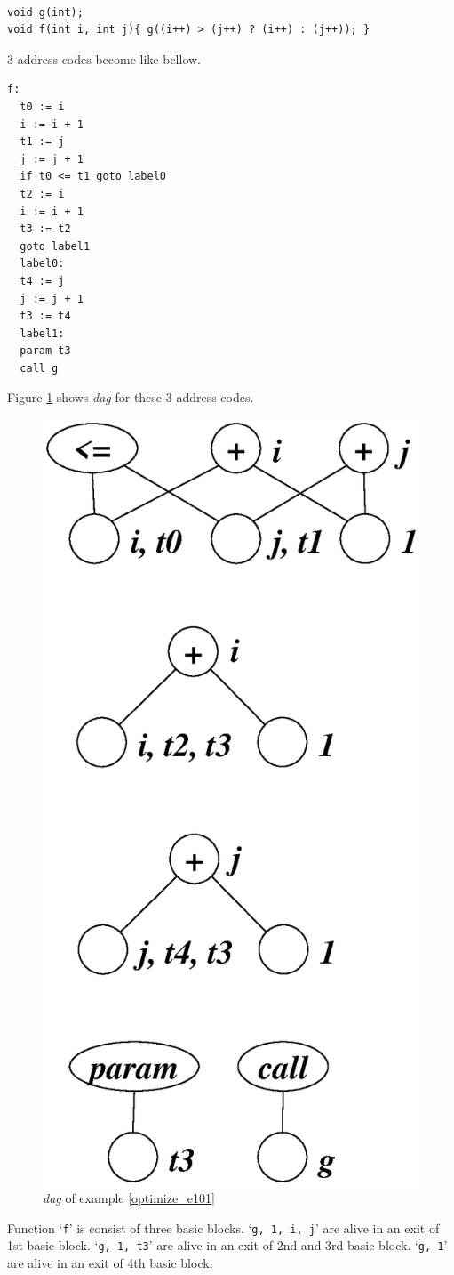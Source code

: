 \begin{Example}
\label{optimize_e101}
\begin{verbatim}

void g(int);
void f(int i, int j){ g((i++) > (j++) ? (i++) : (j++)); }
\end{verbatim}
3 address codes become like bellow.
\begin{verbatim}
f:
  t0 := i
  i := i + 1
  t1 := j
  j := j + 1
  if t0 <= t1 goto label0
  t2 := i
  i := i + 1
  t3 := t2
  goto label1
  label0:
  t4 := j
  j := j + 1
  t3 := t4
  label1:
  param t3
  call g
\end{verbatim}
Figure \ref{optimize_e102} shows {\em dag} for these 3 address codes.
\begin{figure}[htbp]
\begin{center}
\includegraphics[width=0.556\linewidth,height=1.1\linewidth]{opt044.eps}
\caption{{\em dag} of example \ref{optimize_e101}}
\label{optimize_e102}
\end{center}
\end{figure}
Function `{\tt{f}}' is consist of three basic blocks.
`{\tt{g, 1, i, j}}' are
alive in an exit of 1st basic block.
`{\tt{g, 1, t3}}' are
alive in an exit of 2nd and 3rd basic block.
`{\tt{g, 1}}' are
alive in an exit of 4th basic block.


\end{Example}
